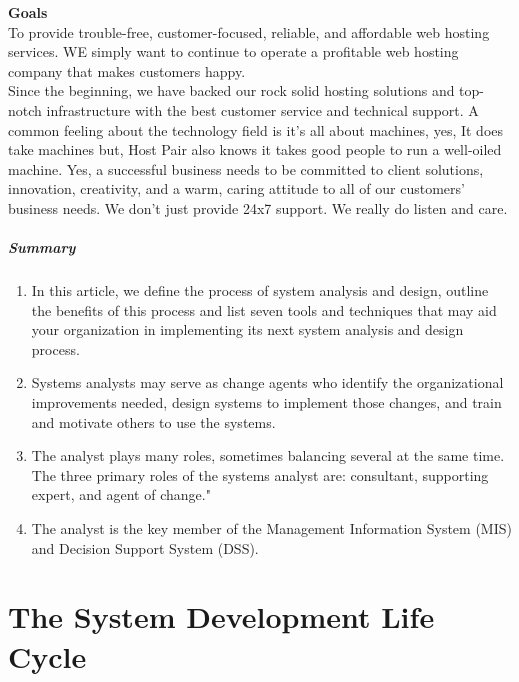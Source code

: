 \documentclass[a4paper,12pt]{report}
\begin{document}
\newpage
\textbf{Goals}\\
To provide trouble-free, customer-focused, reliable, and affordable web hosting services. WE simply want
to continue to operate a profitable web hosting company that makes customers happy. \\Since the
beginning, we have backed our rock solid hosting solutions and top-notch infrastructure with the best
customer service and technical support. A common feeling about the technology field is it's all about
machines, yes, It does take machines but, Host Pair also knows it takes good people to run a well-oiled
machine. Yes, a successful business needs to be committed to client solutions, innovation, creativity, and
a warm, caring attitude to all of our customers' business needs. We don't just provide 24x7 support. We
really do listen and care.
\paragraph{Summary}
\begin{enumerate}
\item In this article, we define the process of system analysis and design, outline the benefits of this process and list seven tools and techniques that may aid your organization in implementing its next system analysis and design process.
\item Systems analysts may serve as change agents who identify the organizational improvements needed, design systems to implement those changes, and train and motivate others to use the systems.
\item The analyst plays many roles, sometimes balancing several at the same time. The three primary roles of the systems analyst are: consultant, supporting expert, and agent of change."
\item The analyst is the key member of the Management Information System (MIS) and Decision Support System (DSS).
\end{enumerate}
\newpage
\chapter{The System Development Life Cycle }
\end{document}
